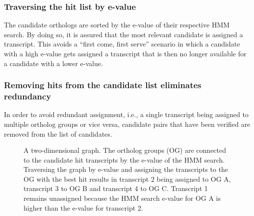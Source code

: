 \subsubsection{Traversing the hit list by e-value}

The candidate orthologs are sorted by the e-value of their respective HMM
search. By doing so, it is assured that the most relevant candidate is assigned
a transcript. This avoids a ``first come, first serve'' scenario in which a
candidate with a high e-value gets assigned a transcript that is then no longer
available for a candidate with a lower e-value.

\subsubsection{Removing hits from the candidate list eliminates redundancy}

In order to avoid redundant assignment, i.e., a single transcript being assigned
to multiple ortholog groups or vice versa, candidate pairs that have been
verified are removed from the list of candidates. 

\begin{figure}[ht]
	\begin{center}
	\end{center}
	\caption{A two-dimensional graph. The ortholog groups (OG) are connected to the
	candidate hit transcripts by the e-value of the HMM search. Traversing the graph
	by e-value and assigning the transcripts to the OG with the best
	hit results in transcript 2 being assigned to OG A, transcript 3 to OG B and
	transcript 4 to OG C. Transcript 1 remains unassigned because the HMM search
	e-value for OG A is higher than the e-value for transcript 2.}
	\label{fig:graph}
\end{figure}
